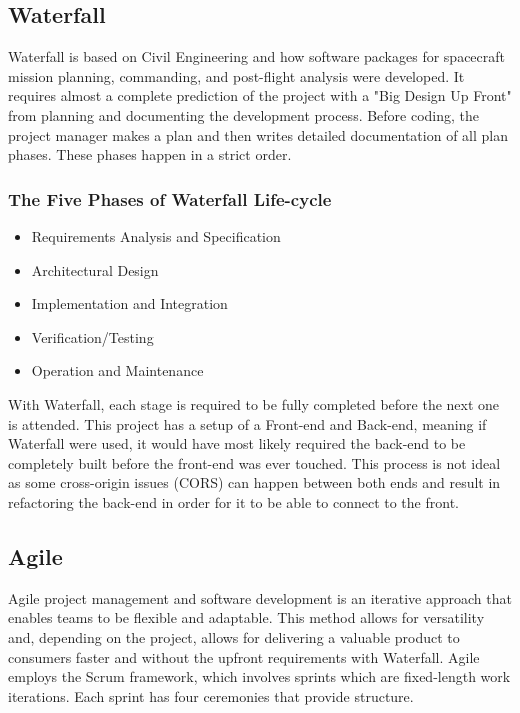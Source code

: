 \subsection{Waterfall}
Waterfall is based on Civil Engineering and how software packages for spacecraft mission planning, commanding, and post-flight analysis were developed. \cite{ref2} It requires almost a complete prediction of the project with a "Big Design Up Front" from planning and documenting the development process. Before coding, the project manager makes a plan and then writes detailed documentation of all plan phases. These phases happen in a strict order.

\subsubsection{The Five Phases of Waterfall Life-cycle}
\begin{itemize}
    \item Requirements Analysis and Specification
    \item Architectural Design
    \item Implementation and Integration
    \item Verification/Testing
    \item Operation and Maintenance
\end{itemize}\cite{ref3}

With Waterfall, each stage is required to be fully completed before the next one is attended. This project has a setup of a Front-end and Back-end, meaning if Waterfall were used, it would have most likely required the back-end to be completely built before the front-end was ever touched. This process is not ideal as some cross-origin issues (CORS) can happen between both ends and result in refactoring the back-end in order for it to be able to connect to the front.

\subsection{Agile}
Agile project management and software development is an iterative approach that enables teams to be flexible and adaptable. This method allows for versatility and, depending on the project, allows for delivering a valuable product to consumers faster and without the upfront requirements with Waterfall. Agile employs the Scrum framework, which involves sprints which are fixed-length work iterations. Each sprint has four ceremonies that provide structure.


